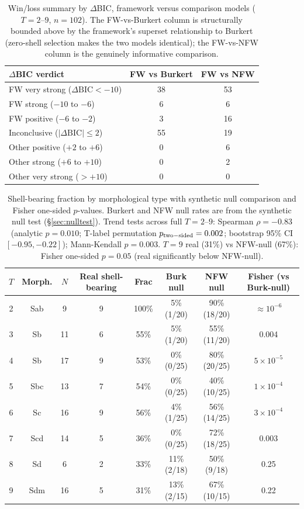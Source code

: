 \documentclass[linenumbers]{aastex701}
\begin{document}
\begin{table}
\centering
\small
\caption{Win/loss summary by $\Delta$BIC, framework versus comparison models ($T=2$--$9$, $n=102$). The FW-vs-Burkert column is structurally bounded above by the framework's superset relationship to Burkert (zero-shell selection makes the two models identical); the FW-vs-NFW column is the genuinely informative comparison.}\label{tab:winloss}
\begin{tabular}{l c c}
\hline\hline
$\Delta$BIC verdict & FW vs Burkert & FW vs NFW \\
\hline
FW very strong ($\Delta\mathrm{BIC} < -10$)  & 38 & 53 \\
FW strong ($-10$ to $-6$)                    & 6  & 6 \\
FW positive ($-6$ to $-2$)                   & 3  & 16 \\
Inconclusive ($|\Delta\mathrm{BIC}| \le 2$)  & 55 & 19 \\
Other positive ($+2$ to $+6$)                & 0  & 6 \\
Other strong ($+6$ to $+10$)                 & 0  & 2 \\
Other very strong ($> +10$)                  & 0  & 0 \\
\hline
\end{tabular}
\end{table}

\begin{table}
\centering
\small
\caption{Shell-bearing fraction by morphological type with synthetic null comparison and Fisher one-sided $p$-values. Burkert and NFW null rates are from the synthetic null test (\S\ref{sec:nulltest}). Trend tests across full $T=2$--$9$: Spearman $\rho = -0.83$ (analytic $p = 0.010$; T-label permutation $p_{\rm two-sided} = 0.002$; bootstrap 95\% CI $[-0.95, -0.22]$); Mann-Kendall $p = 0.003$. $T=9$ real (31\%) vs NFW-null (67\%): Fisher one-sided $p = 0.05$ (real significantly below NFW-null).}\label{tab:morphology}
\begin{tabular}{c c c c c c c c}
\hline\hline
$T$ & Morph. & $N$ & Real shell-bearing & Frac & Burk null & NFW null & Fisher (vs Burk-null) \\
\hline
2 & Sab & 9  & 9 & 100\% & 5\% (1/20)  & 90\% (18/20) & $\approx 10^{-6}$ \\
3 & Sb  & 11 & 6 & 55\%  & 5\% (1/20)  & 55\% (11/20) & 0.004 \\
4 & Sb  & 17 & 9 & 53\%  & 0\% (0/25)  & 80\% (20/25) & $5\times10^{-5}$ \\
5 & Sbc & 13 & 7 & 54\%  & 0\% (0/25)  & 40\% (10/25) & $1\times10^{-4}$ \\
6 & Sc  & 16 & 9 & 56\%  & 4\% (1/25)  & 56\% (14/25) & $3\times10^{-4}$ \\
7 & Scd & 14 & 5 & 36\%  & 0\% (0/25)  & 72\% (18/25) & 0.003 \\
8 & Sd  & 6  & 2 & 33\%  & 11\% (2/18) & 50\% (9/18)  & 0.25 \\
9 & Sdm & 16 & 5 & 31\%  & 13\% (2/15) & 67\% (10/15) & 0.22 \\
\hline
\end{tabular}
\end{table}
\end{document}

